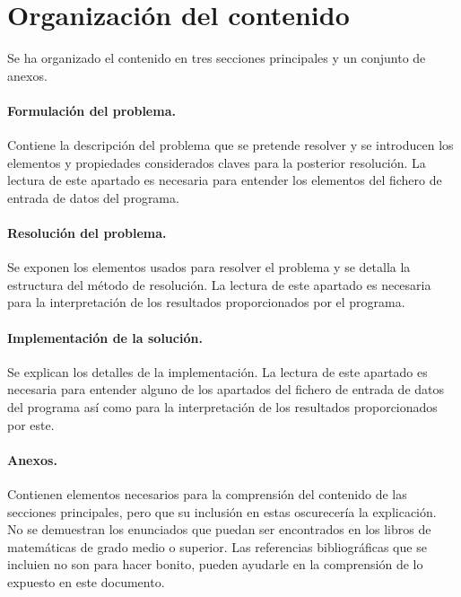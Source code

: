 \section{Organizaci\'on del contenido}

Se ha organizado el contenido en tres secciones principales y un conjunto de 
anexos.

\paragraph{Formulaci\'on del problema.} Contiene la descripci\'on del problema
que se pretende resolver y se introducen los elementos y propiedades considerados 
claves para la posterior resoluci\'on. La lectura de este apartado es necesaria para
entender los elementos del fichero de entrada de datos del programa.

\paragraph{Resoluci\'on del problema.} Se exponen los elementos usados para 
resolver el problema y se detalla la estructura del m\'etodo de resoluci\'on.
La lectura de este apartado es necesaria para la interpretaci\'on de los 
resultados proporcionados por el programa.

\paragraph{Implementaci\'on de la soluci\'on.} Se explican los detalles de
la implementaci\'on. La lectura de este apartado es necesaria para entender 
alguno de los apartados del fichero de entrada de datos del programa as\'i como 
para la interpretaci\'on de los resultados proporcionados por este.

\paragraph{Anexos.} Contienen elementos necesarios para la comprensi\'on del 
contenido de las secciones principales, pero que su inclusi\'on en estas 
oscurecer\'ia la explicaci\'on. \\

No se demuestran los enunciados que puedan ser encontrados
en los libros de matem\'aticas de grado medio o superior. Las referencias 
bibliogr\'aficas que se incluien no son para hacer bonito, pueden ayudarle en
la comprensi\'on de lo expuesto en este documento.


